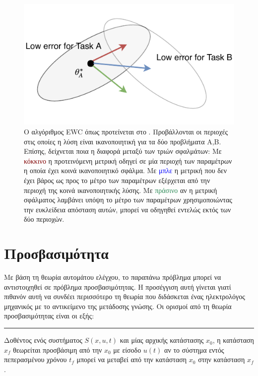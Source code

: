 \begin{figure}[H]
\centering
\includegraphics[width = \textwidth]{figures/transferLearning/elasticity_problem.pdf}
\caption[Αλγόριθμος EWC]{Ο αλγόριθμος EWC όπως προτείνεται στο \cite{62}. Προβάλλονται οι περιοχές στις οποίες η λύση είναι ικανοποιητική για τα δύο προβλήματα A,B. Επίσης, δείχνεται ποια η διαφορά μεταξύ των τριών σφαλμάτων: Με \textcolor{Maroon}{κόκκινο} η προτεινόμενη μετρική οδηγεί σε μία περιοχή των παραμέτρων η οποία έχει κοινά ικανοποιητικό σφάλμα. Με \textcolor{blue}{μπλε} η μετρική που δεν έχει βάρος ως προς το μέτρο των παραμέτρων εξέρχεται από την περιοχή της κοινά ικανοποιητικής λύσης. Με \textcolor{SeaGreen}{πράσινο} αν η μετρική σφάλματος λαμβάνει υπόψη το μέτρο των παραμέτρων χρησιμοποιώντας την ευκλείδεια απόσταση αυτών, μπορεί να οδηγηθεί εντελώς εκτός των δύο περιοχών.}
\label{fig:elasticity_problem}
\end{figure}

\section{Προσβασιμότητα}
 Με βάση τη θεωρία αυτομάτου ελέγχου, το παραπάνω πρόβλημα μπορεί να αντιστοιχηθεί σε πρόβλημα προσβασιμότητας. Η προσέγγιση αυτή γίνεται γιατί πιθανόν αυτή να συνδέει περισσότερο τη θεωρία που διδάσκεται ένας ηλεκτρολόγος μηχανικός με το αντικείμενο της μετάδοσης γνώσης. Οι ορισμοί από τη θεωρία προσβασιμότητας είναι οι εξής:
\vspace{1ex}\\
{ \rule{1ex}{1ex} }%
Δοθέντος ενός συστήματος $S(x,u,t)$ και μίας αρχικής κατάστασης $x_0$, η κατάσταση $x_f$ θεωρείται προσβάσιμη από την $x_0$ με είσοδο $u(t)$ αν το σύστημα εντός πεπερασμένου χρόνου $t_f$ μπορεί να μεταβεί από την κατάσταση $x_0$ στην κατάσταση $x_f$.

